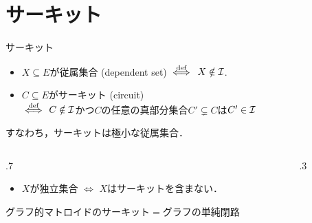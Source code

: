 \documentclass[14pt,aspectratio=169,xcolor=dvipsnames,table,onlytextwidth,dvipdfmx]{beamer}
\begin{document}
\section{サーキット}
\begin{frame}{サーキット}
\begin{definition}
    \begin{itemize}
        \item $X \subseteq E$が\alert{従属集合 (dependent set)} $\overset{\text{def}}{\iff}$ $X \notin \mathcal{I}$.
        \item 
    $C \subseteq E$が\alert{サーキット (circuit)} \\ 
    $\overset{\text{def}}{\iff}$ $C \notin \mathcal{I}$かつ$C$の任意の真部分集合$C' \subsetneq C$は$C' \in \mathcal{I}$ 
    \end{itemize}
\end{definition}
    すなわち，サーキットは極小な従属集合．
    \small
    \pause
    \vfill
    \begin{columns}[T]
    \begin{column}{.7\textwidth}
        \begin{itemize}
            \item $X$が独立集合 $\iff$ $X$はサーキットを含まない．
        \end{itemize}

    \bigskip
     グラフ的マトロイドのサーキット$=$グラフの単純閉路
    \end{column}
    \begin{column}{.3\textwidth}
        \centering
    \end{column}
    \end{columns}
\end{frame}

\newcommand{\circuitaxiominner}{%
        \item[(C1)] $C_1, C_2 \in \caC$, $C_1 \subseteq C_2 \implies C_1=C_2$
        \item[(C2)] $C_1, C_2 \in \caC$ ($C_1 \neq C_2$), $e \in C_1 \cap C_2$ \\ $\implies (C_1 \cup C_2) - e$はサーキットを含む．}
\newcommand{\circuitaxiom}{%
\begin{description}
    \circuitaxiominner
\end{description}}
\end{document}
